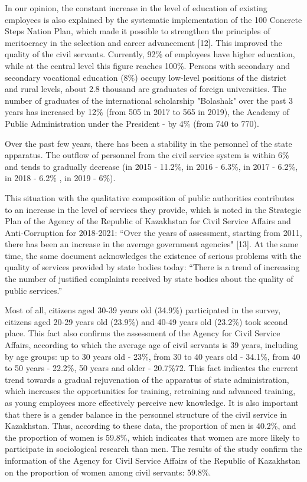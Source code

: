 \begin{multicols}{2}
In our opinion, the constant increase in the level of education of
existing employees is also explained by the systematic implementation of
the 100 Concrete Steps Nation Plan, which made it possible to strengthen
the principles of meritocracy in the selection and career advancement
{[}12{]}. This improved the quality of the civil servants. Currently,
92\% of employees have higher education, while at the central level this
figure reaches 100\%. Persons with secondary and secondary vocational
education (8\%) occupy low-level positions of the district and rural
levels, about 2.8 thousand are graduates of foreign universities. The
number of graduates of the international scholarship "Bolashak" over the
past 3 years has increased by 12\% (from 505 in 2017 to 565 in 2019),
the Academy of Public Administration under the President - by 4\% (from
740 to 770).

Over the past few years, there has been a stability in the personnel of
the state apparatus. The outflow of personnel from the civil service
system is within 6\% and tends to gradually decrease (in 2015 - 11.2\%,
in 2016 - 6.3\%, in 2017 - 6.2\%, in 2018 - 6.2\% , in 2019 - 6\%).

This situation with the qualitative composition of public authorities
contributes to an increase in the level of services they provide, which
is noted in the Strategic Plan of the Agency of the Republic of
Kazakhstan for Civil Service Affairs and Anti-Corruption for 2018-2021:
``Over the years of assessment, starting from 2011, there has been an
increase in the average government agencies" {[}13{]}. At the same time,
the same document acknowledges the existence of serious problems with
the quality of services provided by state bodies today: ``There is a
trend of increasing the number of justified complaints received by state
bodies about the quality of public services.''

Most of all, citizens aged 30-39 years old (34.9\%) participated in the
survey, citizens aged 20-29 years old (23.9\%) and 40-49 years old
(23.2\%) took second place. This fact also confirms the assessment of
the Agency for Civil Service Affairs, according to which the average age
of civil servants is 39 years, including by age groups: up to 30 years
old - 23\%, from 30 to 40 years old - 34.1\%, from 40 to 50 years -
22.2\%, 50 years and older - 20.7\%72. This fact indicates the current
trend towards a gradual rejuvenation of the apparatus of state
administration, which increases the opportunities for training,
retraining and advanced training, as young employees more effectively
perceive new knowledge. It is also important that there is a gender
balance in the personnel structure of the civil service in Kazakhstan.
Thus, according to these data, the proportion of men is 40.2\%, and the
proportion of women is 59.8\%, which indicates that women are more
likely to participate in sociological research than men. The results of
the study confirm the information of the Agency for Civil Service
Affairs of the Republic of Kazakhstan on the proportion of women among
civil servants: 59.8\%.


\end{multicols}
